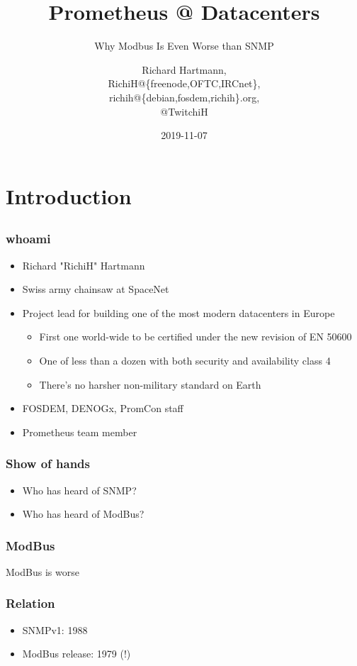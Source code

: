 \documentclass[aspectratio=169]{beamer}
\title{Prometheus @ Datacenters}
\subtitle{Why Modbus Is Even Worse than SNMP}
\author{Richard Hartmann,\\
RichiH@\{freenode,OFTC,IRCnet\},\\
richih@\{debian,fosdem,richih\}.org,\\
@TwitchiH}
\date{2019-11-07}
\begin{document}
\section{Introduction}


\subsection{}

\begin{frame}
	\titlepage
\end{frame}

\begin{frame}
	\frametitle{whoami}
	\begin{itemize}
		\item Richard "RichiH" Hartmann
		\item Swiss army chainsaw at SpaceNet
		\item Project lead for building one of the most modern datacenters in Europe
		\begin{itemize}
			\item First one world-wide to be certified under the new revision of EN 50600
			\item One of less than a dozen with both security and availability class 4
			\item There's no harsher non-military standard on Earth
		\end{itemize}
		\item FOSDEM, DENOGx, PromCon staff
		\item Prometheus team member
	\end{itemize}
\end{frame}

\begin{frame}
	\frametitle{Show of hands}
	\begin{itemize}
		\item Who has heard of SNMP?
		\item Who has heard of ModBus?
	\end{itemize}
\end{frame}

\begin{frame}
	\frametitle{ModBus}
	\centering
	\vfill
	ModBus is worse
	\vfill
\end{frame}

\begin{frame}
	\frametitle{Relation}
	\begin{itemize}
		\item SNMPv1: 1988
		\item ModBus release: 1979 (!)
	\end{itemize}
\end{frame}
\end{document}
